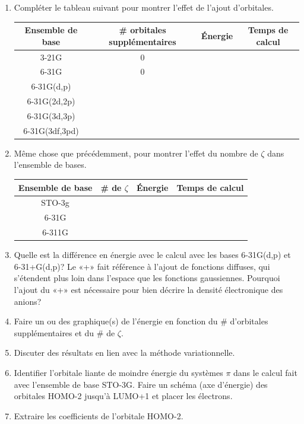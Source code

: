 \documentclass[12pt,letterpaper]{article}
\begin{document}
\begin{enumerate}[resume]
\item Compléter le tableau suivant pour montrer l'effet de l'ajout d'orbitales.
\begin{center}
  \begin{tabular}{cccc}
      \toprule
      Ensemble de base & \# orbitales supplémentaires & Énergie & Temps de calcul \\
      \midrule
      3-21G & 0 & & \\
      6-31G & 0 & & \\
      6-31G(d,p) &  & & \\
      6-31G(2d,2p) &  & & \\
      6-31G(3d,3p) &  & & \\
      6-31G(3df,3pd) &  & & \\
      \bottomrule
  \end{tabular}
\end{center}

\item Même chose que précédemment, pour montrer l'effet du nombre de $\zeta$ dans l'ensemble de bases.
\begin{center}
  \begin{tabular}{cccc}
    \toprule
    Ensemble de base & \# de $\zeta$ & Énergie & Temps de calcul \\
    \midrule
    STO-3g &  & & \\
    6-31G & & & \\
    6-311G &  & & \\
    \bottomrule
  \end{tabular}
\end{center}

\item Quelle est la différence en énergie avec le calcul avec les bases 6-31G(d,p) et 6-31+G(d,p)? Le «+» fait référence à l'ajout de fonctions diffuses, qui s'étendent plus loin dans l'espace que les fonctions gaussiennes. Pourquoi l'ajout du «+» est nécessaire pour bien décrire la densité électronique des anions?
\item Faire un ou des graphique(s) de l'énergie en fonction du \# d'orbitales supplémentaires et du \# de $\zeta$.
\item Discuter des résultats en lien avec la méthode variationnelle.
\item Identifier l'orbitale liante de moindre énergie du systèmes $\pi$ dans le calcul fait avec l'ensemble de base STO-3G. Faire un schéma (axe d'énergie) des orbitales HOMO-2 jusqu'à LUMO+1 et placer les électrons.
\item Extraire les coefficients de l'orbitale HOMO-2.
\end{enumerate}
\end{document}
